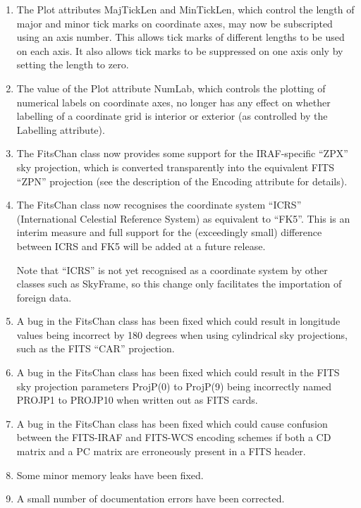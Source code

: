 \documentclass[twoside,11pt]{article}
\begin{document}
\begin{enumerate}
\item The Plot attributes MajTickLen and MinTickLen, which control the
length of major and minor tick marks on coordinate axes, may now be
subscripted using an axis number. This allows tick marks of different
lengths to be used on each axis. It also allows tick marks to be
suppressed on one axis only by setting the length to zero.

\item The value of the Plot attribute NumLab, which controls the
plotting of numerical labels on coordinate axes, no longer has any
effect on whether labelling of a coordinate grid is interior or
exterior (as controlled by the Labelling attribute).

\item The FitsChan class now provides some support for the
IRAF-specific ``ZPX'' sky projection, which is converted transparently
into the equivalent FITS ``ZPN'' projection (see the description of the
Encoding attribute for details).

\item The FitsChan class now recognises the coordinate system ``ICRS''
(International Celestial Reference System) as equivalent to
``FK5''. This is an interim measure and full support for the
(exceedingly small) difference between ICRS and FK5 will be added at a
future release.

Note that ``ICRS'' is not yet recognised as a coordinate system by other
classes such as SkyFrame, so this change only facilitates the
importation of foreign data.

\item A bug in the FitsChan class has been fixed which could result in
longitude values being incorrect by 180 degrees when using cylindrical
sky projections, such as the FITS ``CAR'' projection.

\item A bug in the FitsChan class has been fixed which could result in
the FITS sky projection parameters ProjP(0) to ProjP(9) being
incorrectly named PROJP1 to PROJP10 when written out as FITS cards.

\item A bug in the FitsChan class has been fixed which could cause
confusion between the FITS-IRAF and FITS-WCS encoding schemes if both
a CD matrix and a PC matrix are erroneously present in a FITS header.

\item Some minor memory leaks have been fixed.

\item A small number of documentation errors have been corrected.
\end{enumerate}
\end{document}
